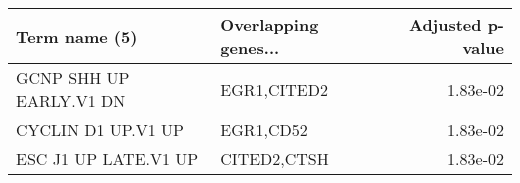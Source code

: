 \begin{tabular}{llr}
\toprule
          Term name (5) & Overlapping genes... &  Adjusted p-value \\
\midrule
GCNP SHH UP EARLY.V1 DN &          EGR1,CITED2 &          1.83e-02 \\
     CYCLIN D1 UP.V1 UP &            EGR1,CD52 &          1.83e-02 \\
   ESC J1 UP LATE.V1 UP &          CITED2,CTSH &          1.83e-02 \\
\bottomrule
\end{tabular}
